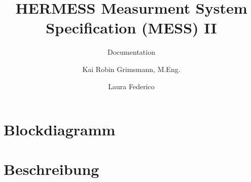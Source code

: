 \documentclass{scrreprt}
\title{HERMESS Measurment System Specification (MESS) II }
\subtitle{Documentation}\author{Kai Robin Grimsmann, M.Eng. \and Laura Federico}
\begin{document}

\thispagestyle{empty}
\tableofcontents 
\pagebreak
\chapter{Blockdiagramm}




\chapter{Beschreibung}



\end{document}
